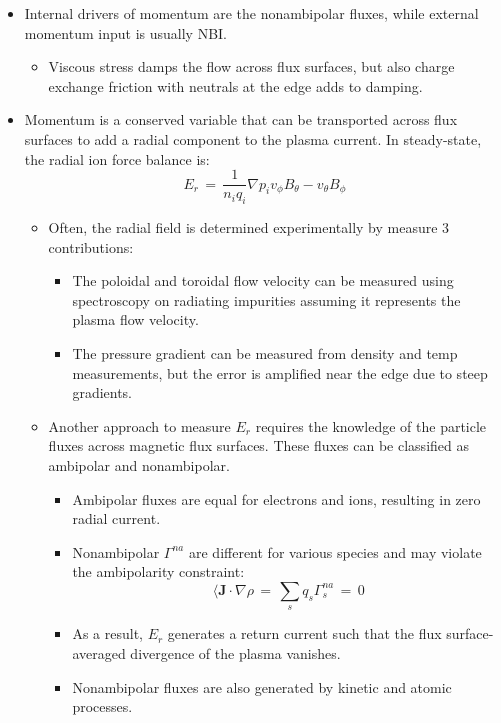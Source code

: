 \documentclass[]{article}
\providecommand{\tightlist}{%
  \setlength{\itemsep}{0pt}\setlength{\parskip}{0pt}}
\begin{document}
\begin{itemize}
\item
  Internal drivers of momentum are the nonambipolar fluxes, while
  external momentum input is usually NBI.

  \begin{itemize}
  \tightlist
  \item
    Viscous stress damps the flow across flux surfaces, but also charge
    exchange friction with neutrals at the edge adds to damping.
  \end{itemize}
\item
  Momentum is a conserved variable that can be transported across flux
  surfaces to add a radial component to the plasma current. In
  steady-state, the radial ion force balance is:
  \[E_r \,=\, \frac{1}{n_i q_i} \nabla p_i v_\phi B_\theta - v_\theta B_\phi\]

  \begin{itemize}
  \item
    Often, the radial field is determined experimentally by measure 3
    contributions:

    \begin{itemize}
    \item
      The poloidal and toroidal flow velocity can be measured using
      spectroscopy on radiating impurities assuming it represents the
      plasma flow velocity.
    \item
      The pressure gradient can be measured from density and temp
      measurements, but the error is amplified near the edge due to
      steep gradients.
    \end{itemize}
  \item
    Another approach to measure \(E_r\) requires the knowledge of the
    particle fluxes across magnetic flux surfaces. These fluxes can be
    classified as ambipolar and nonambipolar.

    \begin{itemize}
    \item
      Ambipolar fluxes are equal for electrons and ions, resulting in
      zero radial current.
    \item
      Nonambipolar \(\Gamma^{na}\) are different for various species and
      may violate the ambipolarity constraint:
      \[\langle \mathbf{J}\cdot \nabla \rho \,=\, \sum_s q_s \Gamma_s^{na} \,=\, 0\]
    \item
      As a result, \(E_r\) generates a return current such that the flux
      surface-averaged divergence of the plasma vanishes.
    \item
      Nonambipolar fluxes are also generated by kinetic and atomic
      processes.
    \end{itemize}
  \end{itemize}
\end{itemize}
\end{document}
